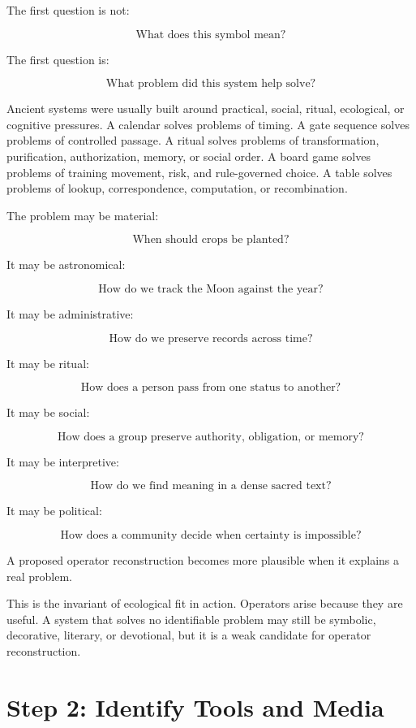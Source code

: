 \documentclass[11pt]{book}
\begin{document}
The first question is not:

\[
\text{What does this symbol mean?}
\]

The first question is:

\[
\text{What problem did this system help solve?}
\]

Ancient systems were usually built around practical, social, ritual, ecological, or cognitive pressures. A calendar solves problems of timing. A gate sequence solves problems of controlled passage. A ritual solves problems of transformation, purification, authorization, memory, or social order. A board game solves problems of training movement, risk, and rule-governed choice. A table solves problems of lookup, correspondence, computation, or recombination.

The problem may be material:

\[
\text{When should crops be planted?}
\]

It may be astronomical:

\[
\text{How do we track the Moon against the year?}
\]

It may be administrative:

\[
\text{How do we preserve records across time?}
\]

It may be ritual:

\[
\text{How does a person pass from one status to another?}
\]

It may be social:

\[
\text{How does a group preserve authority, obligation, or memory?}
\]

It may be interpretive:

\[
\text{How do we find meaning in a dense sacred text?}
\]

It may be political:

\[
\text{How does a community decide when certainty is impossible?}
\]

A proposed operator reconstruction becomes more plausible when it explains a real problem.

This is the invariant of ecological fit in action. Operators arise because they are useful. A system that solves no identifiable problem may still be symbolic, decorative, literary, or devotional, but it is a weak candidate for operator reconstruction.

\section{Step 2: Identify Tools and Media}
\end{document}
